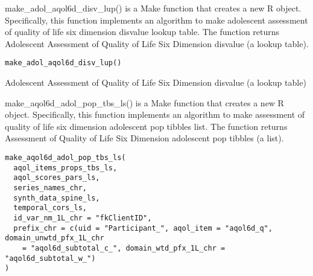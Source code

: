 \documentclass[a4paper]{book}
\begin{document}
%
\begin{Description}\relax
make\_adol\_aqol6d\_disv\_lup() is a Make function that creates a new R object. Specifically, this function implements an algorithm to make adolescent assessment of quality of life six dimension disvalue lookup table. The function returns Adolescent Assessment of Quality of Life Six Dimension disvalue (a lookup table).
\end{Description}
%
\begin{Usage}
\begin{verbatim}
make_adol_aqol6d_disv_lup()
\end{verbatim}
\end{Usage}
%
\begin{Value}
Adolescent Assessment of Quality of Life Six Dimension disvalue (a lookup table)
\end{Value}
%
\begin{Description}\relax
make\_aqol6d\_adol\_pop\_tbs\_ls() is a Make function that creates a new R object. Specifically, this function implements an algorithm to make assessment of quality of life six dimension adolescent pop tibbles list. The function returns Assessment of Quality of Life Six Dimension adolescent pop tibbles (a list).
\end{Description}
%
\begin{Usage}
\begin{verbatim}
make_aqol6d_adol_pop_tbs_ls(
  aqol_items_props_tbs_ls,
  aqol_scores_pars_ls,
  series_names_chr,
  synth_data_spine_ls,
  temporal_cors_ls,
  id_var_nm_1L_chr = "fkClientID",
  prefix_chr = c(uid = "Participant_", aqol_item = "aqol6d_q", domain_unwtd_pfx_1L_chr
    = "aqol6d_subtotal_c_", domain_wtd_pfx_1L_chr = "aqol6d_subtotal_w_")
)
\end{verbatim}
\end{Usage}
%
\end{document}
